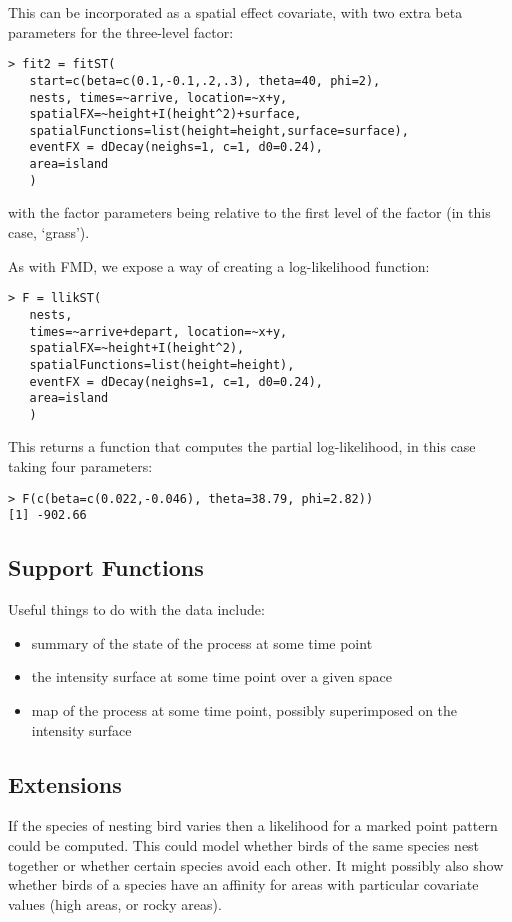\documentclass{article}
\begin{document}
This can be incorporated as a spatial effect covariate, with two extra
beta parameters for the three-level factor:

\begin{verbatim}
> fit2 = fitST(
   start=c(beta=c(0.1,-0.1,.2,.3), theta=40, phi=2),
   nests, times=~arrive, location=~x+y,
   spatialFX=~height+I(height^2)+surface, 
   spatialFunctions=list(height=height,surface=surface),
   eventFX = dDecay(neighs=1, c=1, d0=0.24),
   area=island
   )
\end{verbatim}

with the factor parameters being relative to the first level of the factor (in this case, `grass').

As with FMD, we expose a way of creating a log-likelihood function:

\begin{verbatim}
> F = llikST(
   nests,
   times=~arrive+depart, location=~x+y,
   spatialFX=~height+I(height^2), 
   spatialFunctions=list(height=height),
   eventFX = dDecay(neighs=1, c=1, d0=0.24),
   area=island
   )
\end{verbatim}

This returns a function that computes the partial log-likelihood, in this case taking four parameters:
\begin{verbatim}
> F(c(beta=c(0.022,-0.046), theta=38.79, phi=2.82))
[1] -902.66
\end{verbatim}

\subsection*{Support Functions}

Useful things to do with the data include:
\begin{itemize}
\item summary of the state of the process at some time point
\item the intensity surface at some time point over a given space
\item map of the process at some time point, possibly superimposed on the intensity surface
\end{itemize}

\subsection*{Extensions}

If the species of nesting bird varies then a likelihood for a marked point pattern could be computed. This could
model whether birds of the same species nest together or whether certain species avoid each other. It might possibly 
also show whether birds of a species have an affinity for areas with particular covariate values (high areas, or rocky 
areas).
\end{document}
